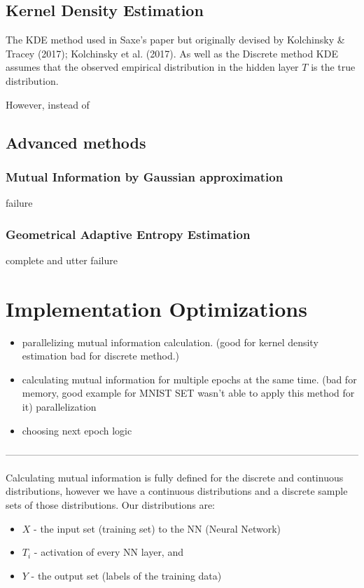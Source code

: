 \subsection{Kernel Density Estimation}

  The KDE method used in Saxe's paper but originally devised by Kolchinsky \&
  Tracey (2017); Kolchinsky et al. (2017). As well as the Discrete method KDE
  assumes that the observed empirical distribution in the hidden layer $T$ is
  the true distribution. 

  However, instead of

\subsection{Advanced methods} \label{ssection:advanced}
\subsubsection{Mutual Information by Gaussian approximation}
  failure
\subsubsection{Geometrical Adaptive Entropy Estimation}
  complete and utter failure

\section{Implementation Optimizations}


\begin{itemize}
  \item{
      parallelizing mutual information calculation. (good for kernel density
      estimation bad for discrete method.)
    }
  \item{
      calculating mutual information for multiple epochs at the same time. (bad
      for memory, good example for MNIST SET wasn't able to apply this method
      for it)
     parallelization
    }
  \item{
     choosing next epoch logic
    }
\end{itemize}



------------------------------------------------------------------------------------------------------------


Calculating mutual information is fully defined for the discrete and continuous
distributions, however we have a continuous distributions and a discrete sample
sets of those distributions. Our distributions are:
\begin{itemize}
  \item{
      $X$ - the input set (training set) to the NN (Neural Network)
    }
  \item{
      $T_i$ - activation of every NN layer, and
    }
  \item{
      $Y$ - the output set (labels of the training data)
    }
\end{itemize}


